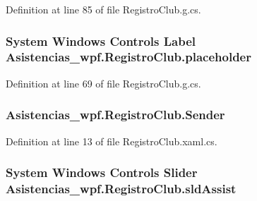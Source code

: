 Definition at line 85 of file Registro\-Club.\-g.\-cs.

\hypertarget{class_asistencias__wpf_1_1_registro_club_a07b0246ff810b1657973443172007999}{
\subsubsection[{placeholder}]{\setlength{\rightskip}{0pt plus 5cm}System Windows Controls Label Asistencias\-\_\-wpf.\-Registro\-Club.\-placeholder\hspace{0.3cm}{\ttfamily [package]}}}\label{class_asistencias__wpf_1_1_registro_club_a07b0246ff810b1657973443172007999}


Definition at line 69 of file Registro\-Club.\-g.\-cs.

\hypertarget{class_asistencias__wpf_1_1_registro_club_ac048d137bde3fd429180c98f34d784eb}{
\subsubsection[{Sender}]{ Asistencias\-\_\-wpf.\-Registro\-Club.\-Sender\hspace{0.3cm}{\ttfamily [private]}}}\label{class_asistencias__wpf_1_1_registro_club_ac048d137bde3fd429180c98f34d784eb}


Definition at line 13 of file Registro\-Club.\-xaml.\-cs.

\hypertarget{class_asistencias__wpf_1_1_registro_club_a3488b5171d3eb821ec59219ca8d4fbf6}{
\subsubsection[{sld\-Assist}]{\setlength{\rightskip}{0pt plus 5cm}System Windows Controls Slider Asistencias\-\_\-wpf.\-Registro\-Club.\-sld\-Assist\hspace{0.3cm}{\ttfamily [package]}}}\label{class_asistencias__wpf_1_1_registro_club_a3488b5171d3eb821ec59219ca8d4fbf6}


